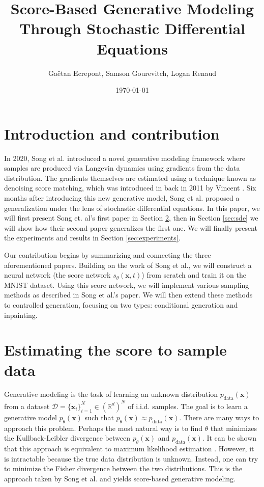 \documentclass{article}
\title{Score-Based Generative Modeling Through Stochastic Differential Equations}
\author{Gaëtan Ecrepont, Samson Gourevitch, Logan Renaud}
\date{\today}
\begin{document}
\maketitle

\tableofcontents

\newpage

\section{Introduction and contribution} \label{sec:intro}
In 2020, Song et al. introduced a novel generative modeling framework \cite{score-matching} where samples are produced 
via Langevin dynamics using gradients from the data distribution. The gradients themselves are estimated using a technique known as denoising score matching, which was introduced in back in 2011 by Vincent \cite{score-da}. Six months after introducing this new generative model, Song et al. proposed a generalization under the lens of stochastic differential equations.
In this paper, we will first present Song et. al's first paper \cite{score-matching} in Section \ref{sec:score}, 
then in Section \ref{sec:sde} we will show how their second paper \cite{scorebased-sde} generalizes the first one. 
We will finally present the experiments and results in Section \ref{sec:experiments}.

Our contribution begins by summarizing and connecting the three aforementioned papers. 
Building on the work of Song et al., we will construct a neural network (the score network $s_\theta(\mathbf{x},t)$) 
from scratch and train it on the MNIST dataset. Using this score network, we will implement various sampling methods 
as described in Song et al.'s paper. We will then extend these methods to controlled generation, focusing on two types: conditional generation and inpainting.

\section{Estimating the score to sample data} \label{sec:score}
Generative modeling is the task of learning an unknown distribution $p_\text{data}(\mathbf{x})$ from a dataset 
$\mathcal{D} = \{\mathbf{x}_i\}_{i=1}^N \in (\mathbb{R}^d)^N$ of i.i.d. samples. The goal is to learn a generative model $p_\theta(\mathbf{x})$ 
such that $p_\theta(\mathbf{x}) \approx p_\text{data}(\mathbf{x})$. There are many ways to approach this problem. Perhaps the 
most natural way is to find $\theta$ that minimizes the Kullback-Leibler divergence between $p_\theta(\mathbf{x})$ and 
$p_\text{data}(\mathbf{x})$. It can be shown that this approach is equivalent to maximum likelihood estimation \cite{lyu}. 
However, it is intractable because the true data distribution is unknown. Instead, one can try to minimize the Fisher 
divergence between the two distributions. This is the approach taken by Song et al. and yields score-based generative modeling.
\end{document}
